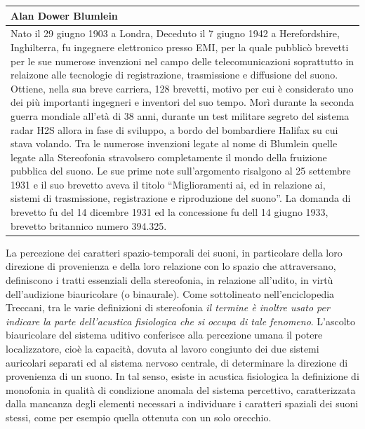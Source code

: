 \begin{tabular}{L{.969\textwidth}}%
\toprule
	\textbf{Alan Dower Blumlein}\\
\midrule
Nato il 29 giugno 1903 a Londra, Deceduto il 7 giugno 1942 a Herefordshire,
Inghilterra, fu ingegnere elettronico presso EMI, per la quale pubblicò brevetti
per le sue numerose invenzioni nel campo delle telecomunicazioni soprattutto in
relaizone alle tecnologie di registrazione, trasmissione e diffusione del suono.
Ottiene, nella sua breve carriera, 128 brevetti, motivo per cui è considerato
uno dei più importanti ingegneri e inventori del suo tempo. Morì durante la
seconda guerra mondiale all'età di 38 anni, durante un test militare segreto del
sistema radar H2S allora in fase di sviluppo, a bordo del bombardiere Halifax
su cui stava volando. Tra le numerose invenzioni legate al nome di Blumlein
quelle legate alla Stereofonia stravolsero completamente il mondo della
fruizione pubblica del suono. Le sue prime note sull'argomento risalgono al 25
settembre 1931 e il suo brevetto aveva il titolo “Miglioramenti ai, ed in
relazione ai, sistemi di trasmissione, registrazione e riproduzione del suono”.
La domanda di brevetto fu del 14 dicembre 1931 ed la concessione fu dell
14 giugno 1933, brevetto britannico numero 394.325.\\
\bottomrule
\end{tabular}

\clearpage

La percezione dei caratteri spazio-temporali dei suoni, in particolare della
loro direzione di provenienza e della loro relazione con lo spazio che
attraversano, definiscono i tratti essenziali della stereofonia, in relazione
all'udito, in virtù dell’audizione biauricolare (o binaurale). Come sottolineato
nell'enciclopedia Treccani, tra le varie definizioni di stereofonia \emph{il
termine è inoltre usato per indicare la parte dell’acustica fisiologica
che si occupa di tale fenomeno}. L'ascolto biauricolare del sistema uditivo
conferisce alla percezione umana il potere localizzatore, cioè la capacità,
dovuta al lavoro congiunto dei due sistemi auricolari separati ed al sistema
nervoso centrale, di determinare la direzione di provenienza di un suono. In tal
senso, esiste in acustica fisiologica la definizione di monofonia in qualità di
condizione anomala del sistema percettivo, caratterizzata dalla mancanza degli
elementi necessari a individuare i caratteri spaziali dei suoni stessi, come per
esempio quella ottenuta con un solo orecchio.

